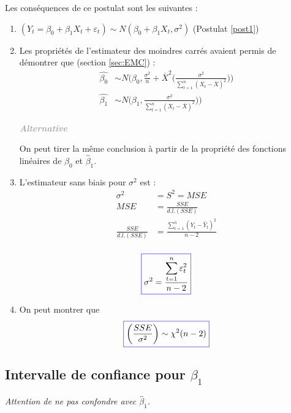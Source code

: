 \documentclass[11pt,french]{report}
\newenvironment{moreInfo}[1]
	{\begin{mdframed}
	\textcolor{darkgray}{\huge \raisebox{-3.5pt}{\faInfo} 
	\hspace{0.5cm} \large\bfseries #1}\\[5pt]
	\normalsize
	\makebox[0.1\textwidth][l]{}	
	\begin{minipage}{10cm}}
	{	\end{minipage}
	\end{mdframed}}
\begin{document}
Les conséquences de ce postulat sont les suivantes :
\begin{enumerate}
\item $(Y_t = \beta_0 + \beta_1X_t + \varepsilon_t) \sim N(\beta_0 + \beta_1X_t, \sigma^2)$ (Postulat \ref{post1})
\item Les propriétés de l'estimateur des moindres carrés avaient permis de démontrer que (section \ref{sec:EMC}) :
	\begin{align*}
	     \hat{\beta_0} &\sim N\Bigg(\beta_0, \frac{\sigma^2}{n}  + \overline{X}^2 \bigg(\frac{\sigma^2}{\displaystyle\sum_{t=1}^n (X_t - \overline{X})^2}\bigg)\Bigg) \\
	     \hat{\beta_1} &\sim N\Bigg(\beta_1, \frac{\sigma^2}{\displaystyle\sum_{t=1}^n(X_t - \overline{X})^2})\Bigg)
	\end{align*}
	
\begin{moreInfo}{\emph{Alternative}}
	On peut tirer la même conclusion à partir de la propriété des fonctions linéaires de $\hat{\beta}_0$ et $\hat{\beta}_1$.
\end{moreInfo}

\item L'estimateur sans biais pour $\sigma^2$ est :
\begin{align*}
\sigma^2 &= S^2 = MSE \\
MSE &= \frac{SSE}{d.l.(SSE)} \\
\frac{SSE}{d.l.(SSE)} &= \frac{\displaystyle\sum_{t=1}^n (Y_t - \hat{Y}_t)^2}{n-2} \\
\end{align*}

\begin{equation}
\label{eq:s2}
\color{blue}
\boxed{\color{black}
\sigma^2 = \frac{\displaystyle\sum_{t=1}^n \varepsilon_t^2}{n-2}}
\end{equation}

\item On peut montrer que 
\begin{equation}
\label{eq:ssesigma}
\color{blue}
\boxed{\color{black}
\bigg(\frac{SSE}{\sigma^2}\bigg) \sim \chi^2(n - 2) }
\end{equation}
\end{enumerate}

\subsection{Intervalle de confiance pour $\beta_1$}
\emph{Attention de ne pas confondre avec $\hat{\beta}_1$.}
\end{document}
